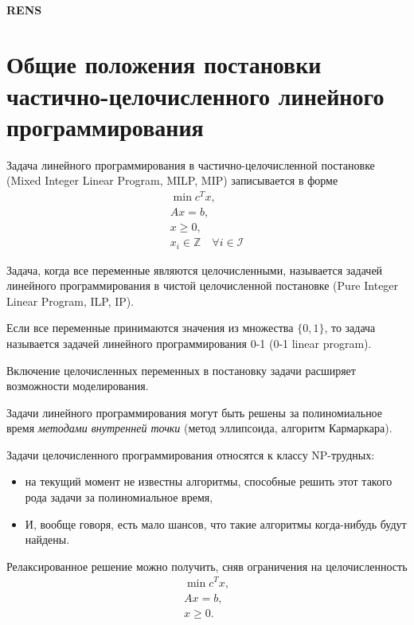 \documentclass[%
	11pt,
	a4paper,
	utf8,
		]{article}
\begin{document}
\paragraph{RENS} 


\section{Общие положения постановки частично-целочисленного линейного программирования}

Задача линейного программирования в частично-целочисленной постановке (Mixed Integer Linear Program, MILP, MIP) записывается в форме
\begin{align*}
	\min c^T x,\\
	Ax = b,\\
	x \geqslant 0,\\
	x_i \in \mathbb{Z} \quad \forall i \in \mathcal{I}
\end{align*}

Задача, когда все переменные являются целочисленными, называется задачей линейного программирования в чистой целочисленной постановке (Pure Integer Linear Program, ILP, IP).

Если все переменные принимаются значения из множества $ \{ 0, 1 \} $, то задача называется задачей линейного программирования 0-1 (0-1 linear program).

Включение целочисленных переменных в постановку задачи расширяет возможности моделирования.

Задачи линейного программирования могут быть решены за полиномиальное время \emph{методами внутренней точки} (метод эллипсоида, алгоритм Кармаркара). 

Задачи целочисленного программирования относятся к классу NP-трудных:
\begin{itemize}
	\item на текущий момент не известны алгоритмы, способные решить этот такого рода задачи за полиномиальное время,
	
	\item И, вообще говоря, есть мало шансов, что такие алгоритмы когда-нибудь будут найдены.
\end{itemize}

Релаксированное решение можно получить, сняв ограничения на целочисленность
\begin{align*}
	\min c^T x,\\
	Ax = b,\\
	x \geqslant 0.
\end{align*}
\end{document}
